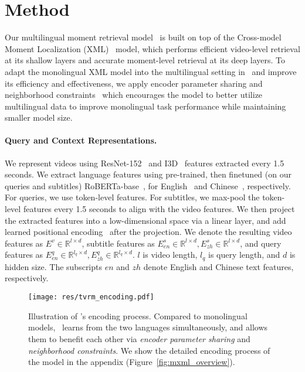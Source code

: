 \section{Method}\label{method}
Our multilingual moment retrieval model \ModelName~is built on top of the Cross-model Moment Localization (XML)~\cite{lei2020tvr} model, which performs efficient video-level retrieval at its shallow layers and accurate moment-level retrieval at its deep layers. 
To adapt the monolingual XML model into the multilingual setting in \DsetName~and improve its efficiency and effectiveness, we apply encoder parameter sharing and neighborhood constraints~\cite{wang2018learning,kim2020mule} which encourages the model to better utilize multilingual data to improve monolingual task performance while maintaining smaller model size.

\paragraph{Query and Context Representations.}
We represent videos using ResNet-152~\cite{he2016deep} and I3D~\cite{carreira2017quo} features extracted every 1.5 seconds. 
We extract language features using pre-trained, then finetuned (on our queries and subtitles) RoBERTa-base~\cite{liu2019roberta}, for English~\cite{liu2019roberta} and Chinese~\cite{cui2020revisiting}, respectively.
For queries, we use token-level features. 
For subtitles, we max-pool the token-level features every 1.5 seconds to align with the video features. 
We then project the extracted features into a low-dimensional space via a linear layer, and add learned positional encoding~\cite{devlin2018bert} after the projection. 
We denote the resulting video features as $E^v \in \mathbb{R}^{l \times d}$, subtitle features as $E^s_{en} \in \mathbb{R}^{l \times d}, E^s_{zh} \in \mathbb{R}^{l \times d}$, and query features as $E^{q}_{en} \in \mathbb{R}^{l_q \times d}, E^{q}_{zh} \in \mathbb{R}^{l_q \times d}$. $l$ is video length, $l_q$ is query length, and $d$ is hidden size. The subscripts $en$ and $zh$ denote English and Chinese text features, respectively. 

\begin{figure}[!t]
\begin{center}
  \texttt{[image: res/tvrm\_encoding.pdf]}
  \vspace{-3pt}
  \caption{
  Illustration of \ModelName's encoding process.
  Compared to monolingual models, \ModelName~learns from the two languages simultaneously, and allows them to benefit each other via \textit{encoder parameter sharing} and \textit{neighborhood constraints}. 
  We show the detailed encoding process of the model in the appendix (Figure~\ref{fig:mxml_overview}).
  }
  \label{fig:tvrm_encoding}
  \vspace{-8pt}
  \end{center}
\end{figure}




